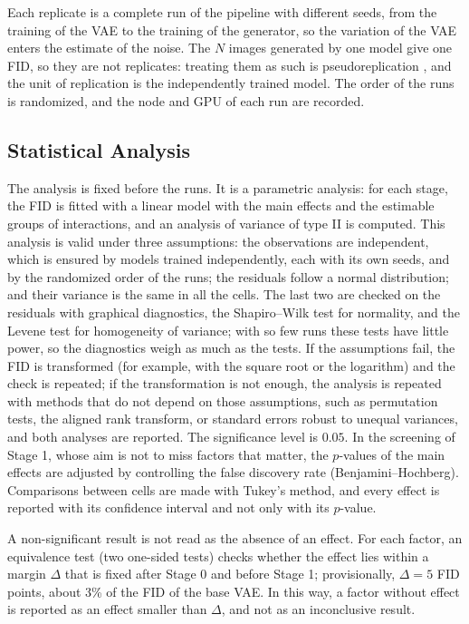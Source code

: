 Each replicate is a complete run of the pipeline with different seeds, from the training of the VAE to the training of the generator, so the variation of the VAE enters the estimate of the noise. The $N$ images generated by one model give one FID, so they are not replicates: treating them as such is pseudoreplication \cite{Hurlbert1984}, and the unit of replication is the independently trained model. The order of the runs is randomized, and the node and GPU of each run are recorded.

\subsection{Statistical Analysis}

The analysis is fixed before the runs. It is a parametric analysis: for each stage, the FID is fitted with a linear model with the main effects and the estimable groups of interactions, and an analysis of variance of type II is computed. This analysis is valid under three assumptions: the observations are independent, which is ensured by models trained independently, each with its own seeds, and by the randomized order of the runs; the residuals follow a normal distribution; and their variance is the same in all the cells. The last two are checked on the residuals with graphical diagnostics, the Shapiro--Wilk test for normality, and the Levene test for homogeneity of variance; with so few runs these tests have little power, so the diagnostics weigh as much as the tests. If the assumptions fail, the FID is transformed (for example, with the square root or the logarithm) and the check is repeated; if the transformation is not enough, the analysis is repeated with methods that do not depend on those assumptions, such as permutation tests, the aligned rank transform, or standard errors robust to unequal variances, and both analyses are reported. The significance level is $0.05$. In the screening of Stage 1, whose aim is not to miss factors that matter, the $p$-values of the main effects are adjusted by controlling the false discovery rate (Benjamini--Hochberg). Comparisons between cells are made with Tukey's method, and every effect is reported with its confidence interval and not only with its $p$-value.

A non-significant result is not read as the absence of an effect. For each factor, an equivalence test (two one-sided tests) checks whether the effect lies within a margin $\Delta$ that is fixed after Stage 0 and before Stage 1; provisionally, $\Delta=5$ FID points, about 3\% of the FID of the base VAE. In this way, a factor without effect is reported as an effect smaller than $\Delta$, and not as an inconclusive result.

